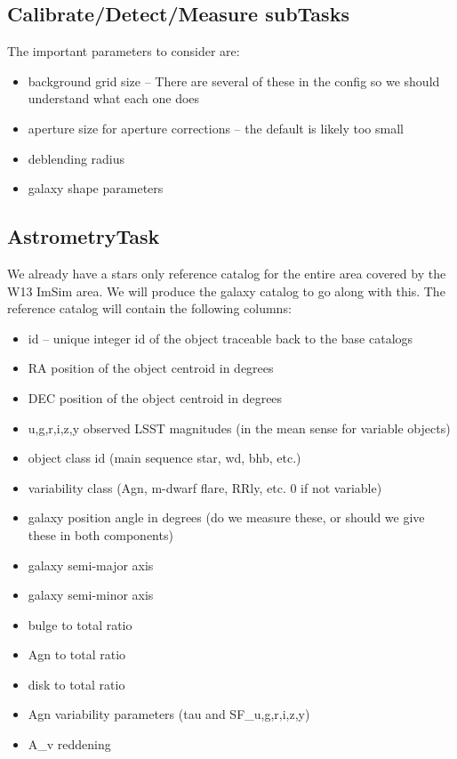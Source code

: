 \documentclass[12pt]{article}
\begin{document}
\subsection{Calibrate/Detect/Measure subTasks}
The important parameters to consider are:
\begin{itemize} 
\item background grid size -- There are several of these in the config
  so we should understand what each one does
\item aperture size for aperture corrections -- the default is likely
  too small
\item deblending radius
\item galaxy shape parameters
\end{itemize}

\subsection{AstrometryTask} 

We already have a stars only reference catalog for the entire area
covered by the W13 ImSim area.  We will produce the galaxy catalog to
go along with this.  The reference catalog will contain the following
columns:

\begin{itemize}
\item id -- unique integer id of the object traceable back to the base catalogs
\item RA position of the object centroid in degrees
\item DEC position of the object centroid in degrees
\item {u,g,r,i,z,y} observed LSST magnitudes (in the mean sense for variable objects)
\item object class id (main sequence star, wd, bhb, etc.)
\item variability class (Agn, m-dwarf flare, RRly, etc. 0 if not variable)
\item galaxy position angle in degrees (do we measure these, or should we give these in both components)
\item galaxy semi-major axis 
\item galaxy semi-minor axis
\item bulge to total ratio
\item Agn to total ratio
\item disk to total ratio
\item Agn variability parameters (tau and SF\_{u,g,r,i,z,y})
\item A\_v reddening 
\end{itemize}
\end{document}

